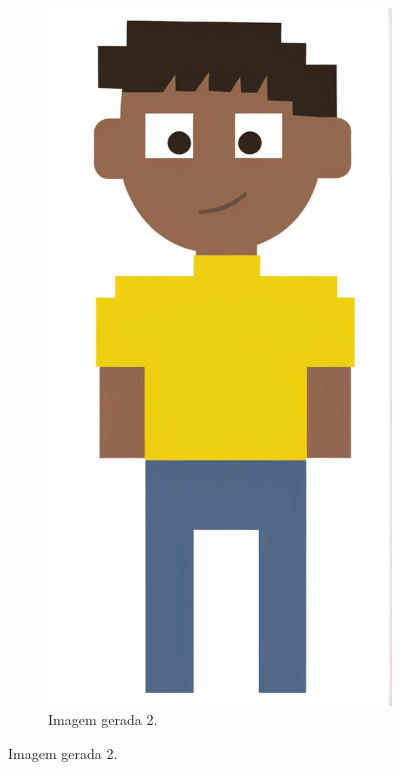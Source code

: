 \begin{figure}[htbp]
\begin{subfigure}{0.15\linewidth}
        \includegraphics[width=1\linewidth]{figs/cgDream/res_img_jug2b.png}
        \caption{\small Imagem gerada 2.}
        \label{fig:cgDream2c}
    \end{subfigure}
\end{figure}


